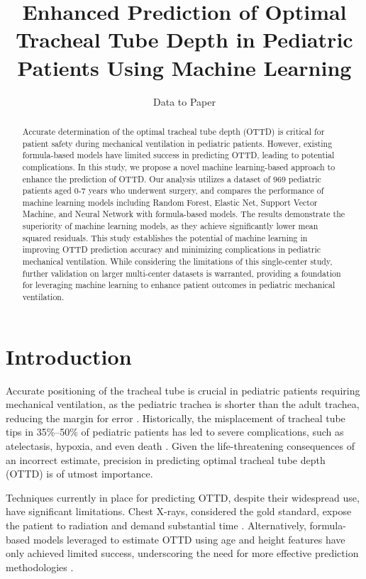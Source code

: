\documentclass[11pt]{article}
\title{Enhanced Prediction of Optimal Tracheal Tube Depth in Pediatric Patients Using Machine Learning}
\author{Data to Paper}
\begin{document}
\maketitle
\begin{abstract}
Accurate determination of the optimal tracheal tube depth (OTTD) is critical for patient safety during mechanical ventilation in pediatric patients. However, existing formula-based models have limited success in predicting OTTD, leading to potential complications. In this study, we propose a novel machine learning-based approach to enhance the prediction of OTTD. Our analysis utilizes a dataset of 969 pediatric patients aged 0-7 years who underwent surgery, and compares the performance of machine learning models including Random Forest, Elastic Net, Support Vector Machine, and Neural Network with formula-based models. The results demonstrate the superiority of machine learning models, as they achieve significantly lower mean squared residuals. This study establishes the potential of machine learning in improving OTTD prediction accuracy and minimizing complications in pediatric mechanical ventilation. While considering the limitations of this single-center study, further validation on larger multi-center datasets is warranted, providing a foundation for leveraging machine learning to enhance patient outcomes in pediatric mechanical ventilation.
\end{abstract}
\section*{Introduction}

Accurate positioning of the tracheal tube is crucial in pediatric patients requiring mechanical ventilation, as the pediatric trachea is shorter than the adult trachea, reducing the margin for error \cite{Principi2011ComplicationsOM}. Historically, the misplacement of tracheal tube tips in 35\%–50\% of pediatric patients has led to severe complications, such as atelectasis, hypoxia, and even death \cite{Rey2009MechanicalCD,Jack2012InlineFR}. Given the life-threatening consequences of an incorrect estimate, precision in predicting optimal tracheal tube depth (OTTD) is of utmost importance.

Techniques currently in place for predicting OTTD, despite their widespread use, have significant limitations. Chest X-rays, considered the gold standard, expose the patient to radiation and demand substantial time \cite{Zhou2022PredictionOE}. Alternatively, formula-based models leveraged to estimate OTTD using age and height features have only achieved limited success, underscoring the need for more effective prediction methodologies \cite{Lee2009BedsidePO}.
\end{document}
